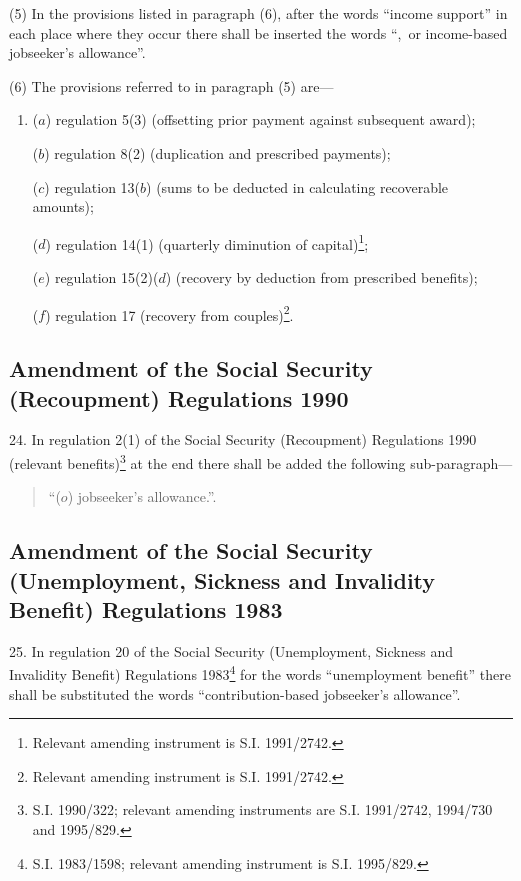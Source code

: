 \documentclass[a4paper]{article}
\begin{document}
(5) In the provisions listed in paragraph (6), after the words “income support” in each place where they occur there shall be inserted the words “,~or income-based jobseeker’s allowance”.

(6) The provisions referred to in paragraph (5) are—
\begin{enumerate}\item[]
($a$) regulation 5(3) (offsetting prior payment against subsequent award);

($b$) regulation 8(2) (duplication and prescribed payments);

($c$) regulation 13($b$) (sums to be deducted in calculating recoverable amounts);

($d$) regulation 14(1) (quarterly diminution of capital)\footnote{\frenchspacing Relevant amending instrument is S.I. 1991/2742.};

($e$) regulation 15(2)($d$) (recovery by deduction from prescribed benefits);

($f$) regulation 17 (recovery from couples)\footnote{\frenchspacing Relevant amending instrument is S.I. 1991/2742.}.
\end{enumerate}

\subsection[24. Amendment of the Social Security (Recoupment) Regulations 1990]{Amendment of the Social Security (Recoupment) Regulations 1990}

24.  In regulation 2(1) of the Social Security (Recoupment) Regulations 1990 (relevant benefits)\footnote{\frenchspacing S.I. 1990/322; relevant amending instruments are S.I. 1991/2742, 1994/730 and 1995/829.} at the end there shall be added the following sub-paragraph—
\begin{quotation}
“($o$) jobseeker’s allowance.”.
\end{quotation}

\subsection[25. Amendment of the Social Security (Unemployment, Sickness and Invalidity Benefit) Regulations 1983]{Amendment of the Social Security (Unemployment, Sickness and Invalidity Benefit) Regulations 1983}

25.  In regulation 20 of the Social Security (Unemployment, Sickness and Invalidity Benefit) Regulations 1983\footnote{\frenchspacing S.I. 1983/1598; relevant amending instrument is S.I. 1995/829.} for the words “unemployment benefit” there shall be substituted the words “contribution-based jobseeker’s allowance”.
\end{document}

